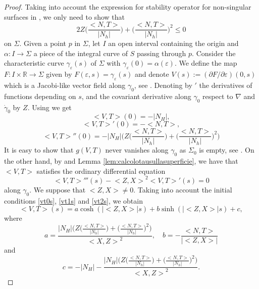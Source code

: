 \documentclass[10pt]{amsart}
\theoremstyle{definition}
\theoremstyle{remark}
\numberwithin{equation}{section}
\begin{document}
\begin{proof} Taking into account the expression for stability operator for non-singular surfaces in \cite[Lemma~8.3]{MR3044134}, we only need to show that 
\[
2Z\bigg({\frac{{\big<{N,T}\big>}}{|N_h|}} \bigg)+{\bigg({\frac{{\big<{N,T}\big>}}{|N_h|}}\bigg)^2}{\leqslant} 0
\]
on ${\Sigma}$. Given a point $p$ in ${\Sigma}$, let $I$ an open interval containing the origin and $\alpha:I\rightarrow {\Sigma}$ a piece of the integral curve of $S$ passing through $p$. Consider the characteristic curve $\gamma_{\varepsilon}(s)$ of ${\Sigma}$ with $\gamma_{\varepsilon}(0)=\alpha({\varepsilon})$. We define the map $F:I\times{{\mathbb{R}}}\rightarrow {\Sigma}$ given by $F({\varepsilon},s)=\gamma_{\varepsilon}(s)$ and denote $V(s):=(\partial F/\partial {\varepsilon})(0,s)$ which is a Jacobi-like vector field along $\gamma_0$, see \cite[Proposition~4.3]{MR3044134}. Denoting by $'$ the derivatives of functions depending on $s$, and the covariant derivative along $\gamma_0$ respect to ${\nabla}$ and $\dot{\gamma}_0$ by $Z$. Using \cite[Lemma~3.1, Eq.~4.4 and Eq.~4.5]{MR3044134} we get
\begin{equation}\label{vt0s}
{\big<{V,T}\big>}(0)=-{|N_{H}|},
\end{equation}
\begin{equation}\label{vt1s}
{\big<{V,T}\big>}'(0)=-{{\big<{N,T}\big>}},
\end{equation}
\begin{equation}\label{vt2s}
{\big<{V,T}\big>}''(0)=-{|N_{H}|} \bigg( Z\bigg({\frac{{\big<{N,T}\big>}}{|N_h|}} \bigg)+{\bigg({\frac{{\big<{N,T}\big>}}{|N_h|}}\bigg)^2}   \bigg)
\end{equation}
It is easy to show that $g(V,T)$ never vanishes along $\gamma_0$ as ${\Sigma}_0$ is empty, see \cite[Proof of Lemma~9.5]{MR3044134}. On the other hand, by \cite[Proposition~4.3]{MR3044134} and Lemma \ref{lem:calcolotausullasuperficie}, we have that ${\big<{V,T}\big>}$ satisfies the ordinary differential equation
\[
{\big<{V,T}\big>}'''(s)-{\big<{Z,X}\big>}^2{\big<{V,T}\big>}'(s)=0
\]
along ${\gamma}_0$. We suppose that ${\big<{Z,X}\big>}\neq 0$. Taking into account the initial conditions \eqref{vt0s}, \eqref{vt1s} and \eqref{vt2s}, we obtain
\[
{\big<{V,T}\big>}(s)=a \cosh(|{\big<{Z,X}\big>}|s)+ b \sinh(|{\big<{Z,X}\big>}|s)+c,
\] 
where 
\[
a=\frac{{|N_{H}|} \bigg( Z\bigg({\frac{{\big<{N,T}\big>}}{|N_h|}} \bigg)+{\bigg({\frac{{\big<{N,T}\big>}}{|N_h|}}\bigg)^2}   \bigg)}{{\big<{X,Z}\big>}^2}, \quad b= -\frac{{\big<{N,T}\big>}}{|{\big<{Z,X}\big>}|}
\]
and
\[ 
c= -{|N_{H}|} -\frac{{|N_{H}|} \bigg( Z\bigg({\frac{{\big<{N,T}\big>}}{|N_h|}} \bigg)+{\bigg({\frac{{\big<{N,T}\big>}}{|N_h|}}\bigg)^2}   \bigg)}{{\big<{X,Z}\big>}^2}.
\]
\end{proof}
\end{document}
